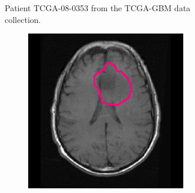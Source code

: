 \begin{subappendices}
\begin{figure}[htbp]
\begin{subfigure}[b]{0.95\textwidth}
\begin{subfigure}[b]{0.215\textwidth}
        \end{subfigure}
        \caption{Patient TCGA-08-0353 from the TCGA-GBM data collection.}
    \end{subfigure}
    \begin{subfigure}[b]{0.95\textwidth}
        \centering
        \hfill
        \begin{subfigure}[b]{0.215\textwidth}
        \includegraphics[width=\textwidth, clip, trim=2.5cm 0.5cm 2.5cm 0.5cm]{Figures/Random_segs/T1_TCGA-12-1094.png}
        \end{subfigure}
        \hfill
        \begin{subfigure}[b]{0.215\textwidth}

\end{subfigure}
\end{subfigure}
\end{figure}
\end{subappendices}
